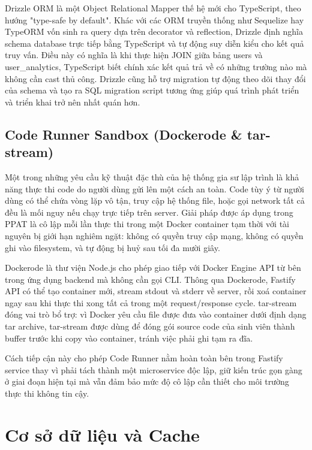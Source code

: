 \documentclass[../main.tex]{subfiles}
\begin{document}
Drizzle ORM là một Object Relational Mapper thế hệ mới cho TypeScript, theo hướng "type-safe by default". Khác với các ORM truyền thống như Sequelize hay TypeORM vốn sinh ra query dựa trên decorator và reflection, Drizzle định nghĩa schema database trực tiếp bằng TypeScript và tự động suy diễn kiểu cho kết quả truy vấn. Điều này có nghĩa là khi thực hiện JOIN giữa bảng users và user\_analytics, TypeScript biết chính xác kết quả trả về có những trường nào mà không cần cast thủ công. Drizzle cũng hỗ trợ migration tự động theo dõi thay đổi của schema và tạo ra SQL migration script tương ứng giúp quá trình phát triển và triển khai trở nên nhất quán hơn.

\subsection{Code Runner Sandbox (Dockerode \& tar-stream)}

Một trong những yêu cầu kỹ thuật đặc thù của hệ thống gia sư lập trình là khả năng thực thi code do người dùng gửi lên một cách an toàn. Code tùy ý từ người dùng có thể chứa vòng lặp vô tận, truy cập hệ thống file, hoặc gọi network tất cả đều là mối nguy nếu chạy trực tiếp trên server. Giải pháp được áp dụng trong PPAT là cô lập mỗi lần thực thi trong một Docker container tạm thời với tài nguyên bị giới hạn nghiêm ngặt: không có quyền truy cập mạng, không có quyền ghi vào filesystem, và tự động bị huỷ sau tối đa mười giây.

Dockerode là thư viện Node.js cho phép giao tiếp với Docker Engine API từ bên trong ứng dụng backend mà không cần gọi CLI. Thông qua Dockerode, Fastify API có thể tạo container mới, stream stdout và stderr về server, rồi xoá container ngay sau khi thực thi xong tất cả trong một request/response cycle. tar-stream đóng vai trò bổ trợ: vì Docker yêu cầu file được đưa vào container dưới định dạng tar archive, tar-stream được dùng để đóng gói source code của sinh viên thành buffer trước khi copy vào container, tránh việc phải ghi tạm ra đĩa.

Cách tiếp cận này cho phép Code Runner nằm hoàn toàn bên trong Fastify service thay vì phải tách thành một microservice độc lập, giữ kiến trúc gọn gàng ở giai đoạn hiện tại mà vẫn đảm bảo mức độ cô lập cần thiết cho môi trường thực thi không tin cậy.

\section{Cơ sở dữ liệu và Cache}
\end{document}
